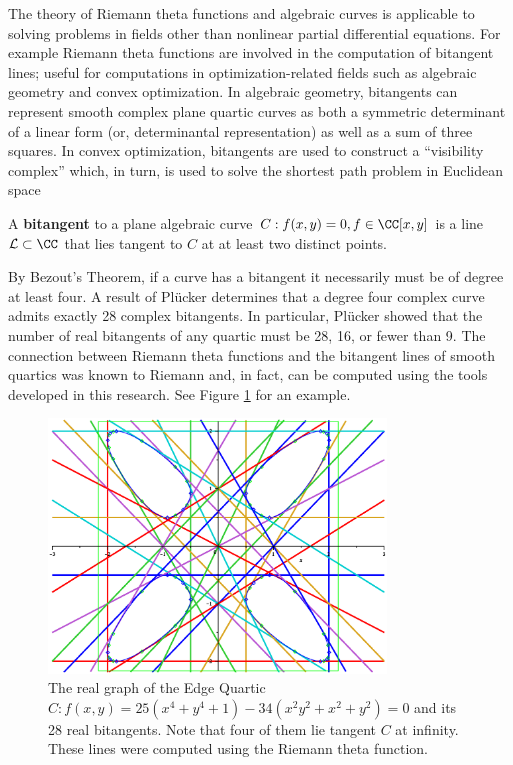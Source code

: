 The theory of Riemann theta functions and algebraic curves is applicable
to solving problems in fields other than nonlinear partial differential
equations. For example Riemann theta functions are involved in the
computation of bitangent lines; useful for computations in
optimization-related fields such as algebraic geometry and convex
optimization. In algebraic geometry, bitangents can represent smooth
complex plane quartic curves as both a symmetric determinant of a linear
form (or, determinantal representation) as well as a sum of three
squares. \cite{PSV11} In convex optimization, bitangents are used to
construct a ``visibility complex'' which, in turn, is used to solve the
shortest path problem in Euclidean space \cite{PocchiolaVegter93}

\begin{definition} \label{def: bitangent}
  A {\bf bitangent} to a plane algebraic curve $C : f(x,y) = 0, f \in
  \CC[x,y]$ is a line $\mathcal{L} \subset \CC$ that lies tangent to $C$
  at at least two distinct points.
\end{definition}

By Bezout's Theorem, if a curve has a bitangent it necessarily must be
of degree at least four. \cite{Bezout1779} A result of Pl\"{u}cker
determines that a degree four complex curve admits exactly 28 complex
bitangents. \cite{Plucker34} In particular, Pl\"{u}cker showed that the
number of real bitangents of any quartic must be 28, 16, or fewer than
9. The connection between Riemann theta functions and the bitangent
lines of smooth quartics was known to Riemann \cite{Riemann76} and, in
fact, can be computed using the tools developed in this research. See
Figure \ref{fig: edge} for an example.


\begin{figure}[t]
  \centering
  \includegraphics[width=0.8\textwidth]{images/edgequartic}
  \caption{The real graph of the Edge Quartic $C: f(x,y) = 25(x^4+y^4+1)
    - 34(x^2y^2+x^2+y^2) = 0$ and its 28 real bitangents. Note that four
    of them lie tangent $C$ at infinity. These lines were computed using
    the Riemann theta function.}
  \label{fig: edge}
\end{figure}


